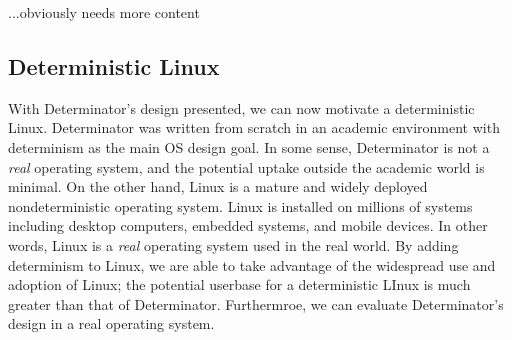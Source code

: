 ...obviously needs more content

\subsection{Deterministic Linux}

With Determinator's design presented, we can now motivate a deterministic
Linux.
Determinator was written from scratch in an academic environment with
determinism as the main OS design goal. In some sense, Determinator is not a
\emph{real} operating system, and the potential uptake outside the academic
world is minimal. On the other hand, Linux is a mature and widely deployed
nondeterministic operating system. Linux is installed on millions of systems
including desktop computers, embedded systems, and mobile devices. In other
words, Linux is a \emph{real} operating system used in the real world. By
adding determinism to Linux, we are able to take advantage of the widespread
use and adoption of Linux; the potential userbase for a deterministic LInux is
much greater than that of Determinator. Furthermroe, we can evaluate
Determinator's design in a real operating system.

\endinput

